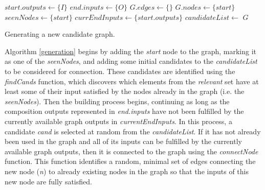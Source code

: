 \documentclass{article}
\begin{document}
\begin{algorithm}[h]
 \setlength{}
 \LinesNumbered
 \SetNlSty{}{}{:}
 $start.outputs \leftarrow \{I\}$\;
 $end.inputs \leftarrow \{O\}$\;
 $G.edges \leftarrow \{\}$\;
 $G.nodes \leftarrow \{start\}$\;
 $seenNodes \leftarrow \{start\}$\;
 $currEndInputs \leftarrow \{start.outputs\}$\;
 $candidateList \leftarrow$ \;
 \;
 \;
 \KwRet $G$\;
 \vspace{2mm}
 \caption{\footnotesize Generating a new candidate graph.}
\label{generation}
\end{algorithm}

Algorithm \ref{generation} begins by adding the \textit{start} node to the graph, marking it as one of the
\textit{seenNodes}, and adding some initial candidates to the \textit{candidateList} to be considered for connection. These candidates
are identified using the \textit{findCands} function, which discovers which elements from the \textit{relevant} set have at least some
of their input satisfied by the nodes already in the graph (i.e. the \textit{seenNodes}). Then the building process begins, continuing
as long as the composition outputs represented in \textit{end.inputs} have not been fulfilled by the currently available graph outputs
in \textit{currentEndInputs}. In this process, a candidate \textit{cand} is selected at random from the \textit{candidateList}. If
it has not already been used in the graph and all of its inputs can be fulfilled by the currently available graph outputs, then it is
connected to the graph using the \textit{connectNode} function. This function identifies a random, minimal set of edges connecting the
new node (\textit{n}) to already existing nodes in the graph so that the inputs of this new node are fully satisfied.
\end{document}
